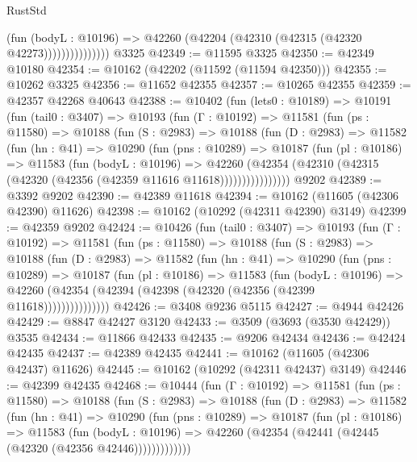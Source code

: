 \begin{lexlean}{RustStd}
\begin{coremodule}
                        (fun (bodyL : @10196) =>
                        @42260 (@42204 (@42310 (@42315 (@42320 @42273)))))))))))))))
    @3325
@42349 := @11595 @3325
@42350 := @42349 @10180
@42354 := @10162 (@42202 (@11592 (@11594 @42350)))
@42355 := @10262 @3325
@42356 := @11652 @42355
@42357 := @10265 @42355
@42359 := @42357 @42268 @40643
@42388 := @10402
    (fun (lets0 : @10189) =>
    @10191
      (fun (tail0 : @3407) =>
      @10193
        (fun (Γ : @10192) =>
        @11581
          (fun (ps : @11580) =>
          @10188
            (fun (S : @2983) =>
            @10188
              (fun (D : @2983) =>
              @11582
                (fun (hn : @41) =>
                @10290
                  (fun (pns : @10289) =>
                  @10187
                    (fun (pl : @10186) =>
                    @11583
                      (fun (bodyL : @10196) =>
                      @42260
                        (@42354
                          (@42310 (@42315 (@42320 (@42356 (@42359 @11616 @11618))))))))))))))))
    @9202
@42389 := @3392 @9202
@42390 := @42389 @11618
@42394 := @10162 (@11605 (@42306 @42390) @11626)
@42398 := @10162 (@10292 (@42311 @42390) @3149)
@42399 := @42359 @9202
@42424 := @10426
    (fun (tail0 : @3407) =>
    @10193
      (fun (Γ : @10192) =>
      @11581
        (fun (ps : @11580) =>
        @10188
          (fun (S : @2983) =>
          @10188
            (fun (D : @2983) =>
            @11582
              (fun (hn : @41) =>
              @10290
                (fun (pns : @10289) =>
                @10187
                  (fun (pl : @10186) =>
                  @11583
                    (fun (bodyL : @10196) =>
                    @42260 (@42354 (@42394 (@42398 (@42320 (@42356 (@42399 @11618)))))))))))))))
@42426 := @3408 @9236 @5115
@42427 := @4944 @42426
@42429 := @8847 @42427 @3120
@42433 := @3509 (@3693 (@3530 @42429)) @3535
@42434 := @11866 @42433
@42435 := @9206 @42434
@42436 := @42424 @42435
@42437 := @42389 @42435
@42441 := @10162 (@11605 (@42306 @42437) @11626)
@42445 := @10162 (@10292 (@42311 @42437) @3149)
@42446 := @42399 @42435
@42468 := @10444
    (fun (Γ : @10192) =>
    @11581
      (fun (ps : @11580) =>
      @10188
        (fun (S : @2983) =>
        @10188
          (fun (D : @2983) =>
          @11582
            (fun (hn : @41) =>
            @10290
              (fun (pns : @10289) =>
              @10187
                (fun (pl : @10186) =>
                @11583
                  (fun (bodyL : @10196) =>
                  @42260 (@42354 (@42441 (@42445 (@42320 (@42356 @42446)))))))))))))

\end{coremodule}
\end{lexlean}
